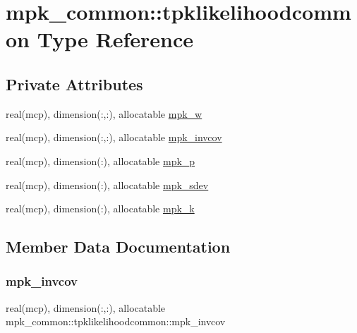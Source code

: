 \hypertarget{structmpk__common_1_1tpklikelihoodcommon}{}\section{mpk\+\_\+common\+:\+:tpklikelihoodcommon Type Reference}
\label{structmpk__common_1_1tpklikelihoodcommon}
\subsection*{Private Attributes}
\begin{DoxyCompactItemize}
\item 
real(mcp), dimension(\+:,\+:), allocatable \mbox{\hyperlink{structmpk__common_1_1tpklikelihoodcommon_ae56a68d7dfb8b94b10a01d62f86e82de}{mpk\+\_\+w}}
\item 
real(mcp), dimension(\+:,\+:), allocatable \mbox{\hyperlink{structmpk__common_1_1tpklikelihoodcommon_a88a43eccfb460032e5f90b291530e7c6}{mpk\+\_\+invcov}}
\item 
real(mcp), dimension(\+:), allocatable \mbox{\hyperlink{structmpk__common_1_1tpklikelihoodcommon_a7816337ccb1b85167107b271f1551054}{mpk\+\_\+p}}
\item 
real(mcp), dimension(\+:), allocatable \mbox{\hyperlink{structmpk__common_1_1tpklikelihoodcommon_aa3c28915ee524d333955d5df25e73580}{mpk\+\_\+sdev}}
\item 
real(mcp), dimension(\+:), allocatable \mbox{\hyperlink{structmpk__common_1_1tpklikelihoodcommon_ad08ef15ab90ffab94162f5dd339349a7}{mpk\+\_\+k}}
\end{DoxyCompactItemize}


\subsection{Member Data Documentation}
\mbox{\label{structmpk__common_1_1tpklikelihoodcommon_a88a43eccfb460032e5f90b291530e7c6}} 
\subsubsection{\texorpdfstring{mpk\+\_\+invcov}{mpk\_invcov}}
{\footnotesize\ttfamily real(mcp), dimension(\+:,\+:), allocatable mpk\+\_\+common\+::tpklikelihoodcommon\+::mpk\+\_\+invcov\hspace{0.3cm}{\ttfamily [private]}}


